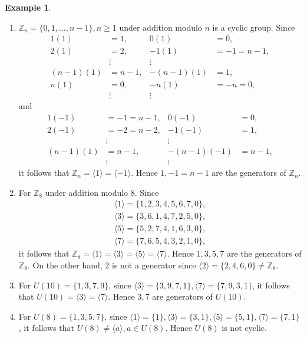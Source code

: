 \documentclass{article}
\theoremstyle{definition}
\newtheorem{example}{Example}[section]
\begin{document}
\begin{example}
\begin{enumerate}
        \item $\mathbb{Z}_n = \{0,1,\dots,n-1\}, n \geq 1$ under addition modulo $n$ is a cyclic group. Since
        \begin{align*}
            1(1) &= 1, & 0(1) &= 0, \\ 
            2(1) &= 2, & -1(1) &= -1 =n-1, \\ 
            & \vdots  & \vdots \\ 
            (n-1)(1) &= n-1, & -(n-1)(1) &= 1, \\ 
            n(1) &= 0, & -n(1)  &= -n = 0, \\ 
            & \vdots & \vdots
        \end{align*}
        and
        \begin{align*}
            1(-1) &= -1=n-1, & 0(-1) &= 0, \\
            2(-1) &= -2=n-2, & -1(-1) &= 1, \\
            & \vdots & \vdots \\
            (n-1)(1) &= n-1, & -(n-1)(-1) &= n-1, \\
            &\vdots & \vdots
        \end{align*}
        it follows that $\mathbb{Z}_n=\langle 1 \rangle = \langle -1 \rangle$. Hence $1,-1=n-1$ are the generators of $\mathbb{Z}_n$.
        
        \item For $\mathbb{Z}_8$ under addition modulo 8. Since
        \begin{align*}
            \langle 1 \rangle = \{1,2,3,4,5,6,7,0\}, \\
            \langle 3 \rangle = \{3,6,1,4,7,2,5,0\}, \\
            \langle 5 \rangle = \{5,2,7,4,1,6,3,0\}, \\
            \langle 7 \rangle = \{7,6,5,4,3,2,1,0\},
        \end{align*}
        it follows that $\mathbb{Z}_8 = \langle 1 \rangle = \langle 3 \rangle = \langle 5 \rangle = \langle 7 \rangle$. Hence $1,3,5,7$ are the generators of $\mathbb{Z}_8$. On the other hand, 2 is not a generator since $\langle 2 \rangle = \{2,4,6,0\} \neq \mathbb{Z}_8$.
        
        \item For $U(10)=\{1,3,7,9\}$, since $\langle 3 \rangle = \{3,9,7,1\}, \langle 7 \rangle = \{7,9,3,1\}$, it follows that $U(10)=\langle 3 \rangle = \langle 7 \rangle$. Hence $3,7$ are generators of $U(10)$.
        
        \item For $U(8)=\{1,3,5,7\}$, since $\langle 1 \rangle = \{1\}, \langle 3 \rangle = \{3,1\}, \langle 5 \rangle = \{5,1\}, \langle 7 \rangle = \{7, 1\}$, it follows that $U(8) \neq \langle a \rangle, a \in U(8)$. Hence $U(8)$ is not cyclic.
    \end{enumerate}
\end{example}
\end{document}
